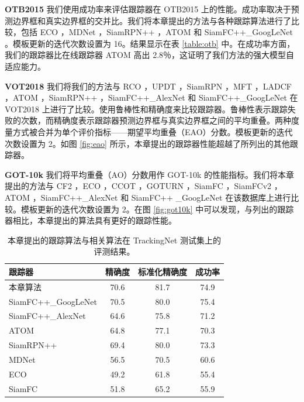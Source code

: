 \textbf{OTB2015} 我们使用成功率来评估跟踪器在 OTB2015 上的性能。成功率取决于预测边界框和真实边界框的交并比。我们将本章提出的方法与各种跟踪算法进行了比较，包括 ECO \cite{danelljan2017eco}，MDNet \cite{MDNet}，SiamRPN++ \cite{SiamRPN++}，ATOM \cite{danelljan2019atom} 和 SiamFC++\_GoogLeNet \cite{SiamFC++}。模板更新的迭代次数设置为 16。结果显示在表 \ref{table:otb} 中。在成功率方面，我们的跟踪器比在线跟踪器 ATOM 高出 2.8％，这证明了我们方法的强大模型自适应能力。

\textbf{VOT2018} 我们将我们的方法与 RCO \cite{kristan2018sixth}，UPDT \cite{bhat2018unveiling}，SiamRPN \cite{SiamRPN}，MFT \cite{kristan2018sixth}，LADCF \cite{kristan2018sixth}，ATOM \cite{danelljan2019atom}，SiamRPN++ \cite{SiamRPN++}，SiamFC++\_AlexNet \cite{SiamFC++} 和 SiamFC++\_GoogLeNet \cite{SiamFC++} 在 VOT2018 上进行了比较。使用鲁棒性和精确度来比较跟踪器。鲁棒性表示跟踪失败的次数，而精确度表示跟踪器预测边界框与真实边界框之间的平均重叠。两种度量方式被合并为单个评价指标——期望平均重叠（EAO）分数。模板更新的迭代次数设置为 2。如图 \ref{fig:eao} 所示，本章提出的跟踪器性能超越了所列出的其他跟踪器。

\textbf{GOT-10k} 我们将平均重叠（AO）分数用作 GOT-10k \cite{GOT-10k} 的性能指标。我们将本章提出的方法与 CF2 \cite{CF2}，ECO \cite{danelljan2017eco}，CCOT \cite{danelljan2016beyond}，GOTURN \cite{GOTURN}，SiamFC \cite{SiamFC}，SiamFCv2 \cite{valmadre2017end}，ATOM \cite{danelljan2019atom}，SiamFC++\_AlexNet \cite{SiamFC++} 和 SiamFC++
\_GoogLeNet \cite{SiamFC++} 在该数据库上进行比较。模板更新的迭代次数设置为 2。在图 \ref{fig:got10k} 中可以发现，与列出的跟踪器相比，本章提出的算法具有更好的跟踪性能。

\nopagebreak[3]
\begin{table}[t!]
\centering
\caption{本章提出的跟踪算法与相关算法在 TrackingNet \cite{muller2018trackingnet} 测试集上的评测结果。}
\begin{tabular}{l c c c}
\toprule
跟踪器   &  精确度   &  标准化精确度 & 成功率  \\
\midrule
本章算法  &  70.6&  81.7 &74.9 \\
SiamFC++\_GoogLeNet \cite{SiamFC++} & 70.5 & 80.0 & 75.4 \\
SiamFC++\_AlexNet \cite{SiamFC++} & 64.6 & 75.8 & 71.2 \\
ATOM \cite{danelljan2019atom} & 64.8 & 77.1 & 70.3 \\
SiamRPN++ \cite{SiamRPN++} &  69.4 & 80.0 &73.3 \\
MDNet \cite{MDNet} &  56.5&  70.5 &60.6 \\
ECO	\cite{danelljan2017eco} &  49.2&  61.8 &55.4 \\
SiamFC \cite{SiamFC} &  51.8&  65.2 &55.9 \\
\bottomrule
\end{tabular}
\label{tabel:trackingnet}
\end{table}
\nopagebreak[3]


